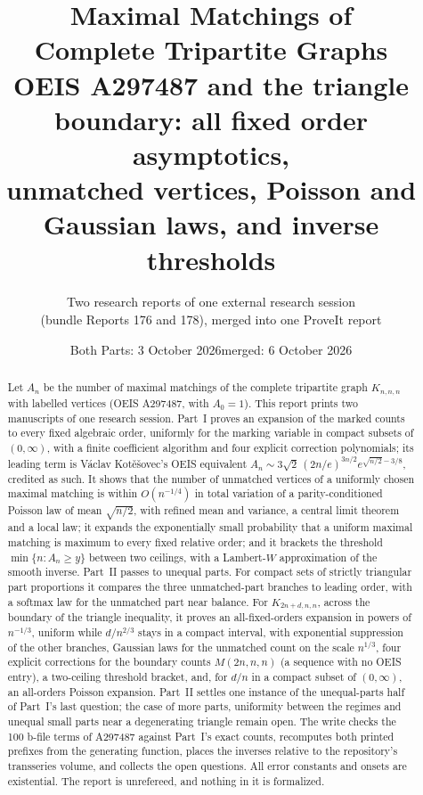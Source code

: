 \documentclass[11pt,letterpaper]{article}
\title{\textbf{Maximal Matchings of\\Complete Tripartite Graphs}\\[7pt]\large OEIS A297487 and the triangle boundary: all fixed order asymptotics,\\unmatched vertices, Poisson and Gaussian laws, and inverse thresholds}
\author{Two research reports of one external research session\\(bundle Reports 176 and 178), merged into one ProveIt report}
\date{Both Parts: 3 October 2026\quad merged: 6 October 2026}
\newcommand{\parthead}{Contents}
\theoremstyle{remark}\newtheorem{remark}[theorem]{Remark}
\begin{document}
\hypersetup{pageanchor=false}
\maketitle
\thispagestyle{plain}
\begin{abstract}
Let $A_n$ be the number of maximal matchings of the complete tripartite graph $K_{n,n,n}$ with labelled vertices (OEIS A297487, with $A_0=1$). This report prints two manuscripts of one research session. Part~I proves an expansion of the marked counts to every fixed algebraic order, uniformly for the marking variable in compact subsets of $(0,\infty)$, with a finite coefficient algorithm and four explicit correction polynomials; its leading term is V\'aclav Kot\v{e}\v{s}ovec's OEIS equivalent $A_n\sim3\sqrt2\,(2n/e)^{3n/2}e^{\sqrt{n/2}-3/8}$, credited as such. It shows that the number of unmatched vertices of a uniformly chosen maximal matching is within $O(n^{-1/4})$ in total variation of a parity-conditioned Poisson law of mean $\sqrt{n/2}$, with refined mean and variance, a central limit theorem and a local law; it expands the exponentially small probability that a uniform maximal matching is maximum to every fixed relative order; and it brackets the threshold $\min\{n:A_n\ge y\}$ between two ceilings, with a Lambert-$W$ approximation of the smooth inverse. Part~II passes to unequal parts. For compact sets of strictly triangular part proportions it compares the three unmatched-part branches to leading order, with a softmax law for the unmatched part near balance. For $K_{2n+d,n,n}$, across the boundary of the triangle inequality, it proves an all-fixed-orders expansion in powers of $n^{-1/3}$, uniform while $d/n^{2/3}$ stays in a compact interval, with exponential suppression of the other branches, Gaussian laws for the unmatched count on the scale $n^{1/3}$, four explicit corrections for the boundary counts $M(2n,n,n)$ (a sequence with no OEIS entry), a two-ceiling threshold bracket, and, for $d/n$ in a compact subset of $(0,\infty)$, an all-orders Poisson expansion. Part~II settles one instance of the unequal-parts half of Part~I's last question; the case of more parts, uniformity between the regimes and unequal small parts near a degenerating triangle remain open. The write checks the 100 b-file terms of A297487 against Part~I's exact counts, recomputes both printed prefixes from the generating function, places the inverses relative to the repository's transseries volume, and collects the open questions. All error constants and onsets are existential. The report is unrefereed, and nothing in it is formalized.
\end{abstract}
\hypersetup{pageanchor=true}
{\small\setlength{\parskip}{0pt}\tableofcontents}
\clearpage
\renewcommand{\parthead}{Front matter}
\end{document}
